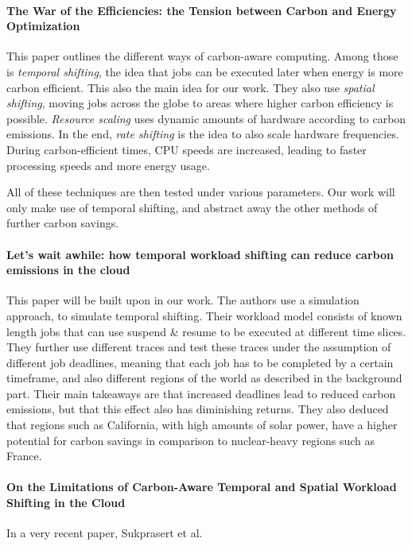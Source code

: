 \paragraph{The War of the Efficiencies: the Tension between Carbon and Energy Optimization}\cite{hanafy_war_2023} This paper outlines the different ways of carbon-aware computing. 
Among those is \emph{temporal shifting}, the idea that jobs can be executed later when energy is more carbon efficient. This also the main idea for our work. 
They also use \emph{spatial shifting}, moving jobs across the globe to areas where higher carbon efficiency is possible. 
\emph{Resource scaling} uses dynamic amounts of hardware according to carbon emissions.
In the end, \emph{rate shifting} is the idea to also scale hardware frequencies. During carbon-efficient times, CPU speeds are increased, leading to faster processing speeds and more energy usage.

All of these techniques are then tested under various parameters. Our work will only make use of temporal shifting, and abstract away the other methods of further carbon savings.

\paragraph{Let's wait awhile: how temporal workload shifting can reduce carbon emissions in the cloud} This paper will be built upon in our work.
The authors \cite{wiesner_lets_2021} use a simulation approach, to simulate temporal shifting. Their workload model consists of known length jobs that can use suspend \& resume to be executed at different time slices. 
They further use different traces and test these traces under the assumption of different job deadlines, meaning that each job has to be completed by a certain timeframe, and also different regions of the world as described in the background part. 
Their main takeaways are that increased deadlines lead to reduced carbon emissions, but that this effect also has diminishing returns. 
They also deduced that regions such as California, with high amounts of solar power, have a higher potential for carbon savings in comparison to nuclear-heavy regions such as France.

\paragraph{On the Limitations of Carbon-Aware Temporal and Spatial Workload Shifting in the Cloud} 
In a very recent paper, Sukprasert et al. \cite{sukprasert_limitations_2024}

